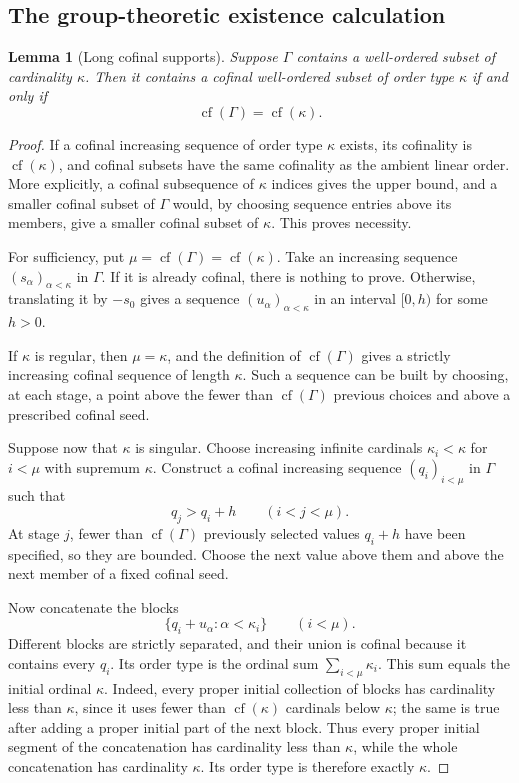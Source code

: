 \documentclass[11pt,letterpaper]{article}
\numberwithin{equation}{section}
\newtheorem{lemma}[theorem]{Lemma}
\theoremstyle{definition}
\theoremstyle{remark}
\newcommand{\cf}{\operatorname{cf}}
\begin{document}
\subsection{The group-theoretic existence calculation}
\begin{lemma}[Long cofinal supports]\label{fkc:lem:long-cofinal}
Suppose $\Gamma$ contains a well-ordered subset of cardinality $\kappa$. Then it contains a cofinal well-ordered subset of order type $\kappa$ if and only if
\begin{equation}\label{fkc:eq:cofinal-condition}
 \cf(\Gamma)=\cf(\kappa).
\end{equation}
\end{lemma}
\begin{proof}
If a cofinal increasing sequence of order type $\kappa$ exists, its cofinality is $\cf(\kappa)$, and cofinal subsets have the same cofinality as the ambient linear order. More explicitly, a cofinal subsequence of $\kappa$ indices gives the upper bound, and a smaller cofinal subset of $\Gamma$ would, by choosing sequence entries above its members, give a smaller cofinal subset of $\kappa$. This proves necessity.

For sufficiency, put $\mu=\cf(\Gamma)=\cf(\kappa)$. Take an increasing sequence $(s_\alpha)_{\alpha<\kappa}$ in $\Gamma$. If it is already cofinal, there is nothing to prove. Otherwise, translating it by $-s_0$ gives a sequence $(u_\alpha)_{\alpha<\kappa}$ in an interval $[0,h)$ for some $h>0$.

If $\kappa$ is regular, then $\mu=\kappa$, and the definition of $\cf(\Gamma)$ gives a strictly increasing cofinal sequence of length $\kappa$. Such a sequence can be built by choosing, at each stage, a point above the fewer than $\cf(\Gamma)$ previous choices and above a prescribed cofinal seed.

Suppose now that $\kappa$ is singular. Choose increasing infinite cardinals $\kappa_i<\kappa$ for $i<\mu$ with supremum $\kappa$. Construct a cofinal increasing sequence $(q_i)_{i<\mu}$ in $\Gamma$ such that
\[
 q_j>q_i+h\qquad(i<j<\mu).
\]
At stage $j$, fewer than $\cf(\Gamma)$ previously selected values $q_i+h$ have been specified, so they are bounded. Choose the next value above them and above the next member of a fixed cofinal seed.

Now concatenate the blocks
\[
 \{q_i+u_\alpha:\alpha<\kappa_i\}\qquad(i<\mu).
\]
Different blocks are strictly separated, and their union is cofinal because it contains every $q_i$. Its order type is the ordinal sum $\sum_{i<\mu}\kappa_i$. This sum equals the initial ordinal $\kappa$. Indeed, every proper initial collection of blocks has cardinality less than $\kappa$, since it uses fewer than $\cf(\kappa)$ cardinals below $\kappa$; the same is true after adding a proper initial part of the next block. Thus every proper initial segment of the concatenation has cardinality less than $\kappa$, while the whole concatenation has cardinality $\kappa$. Its order type is therefore exactly $\kappa$.
\end{proof}
\end{document}
